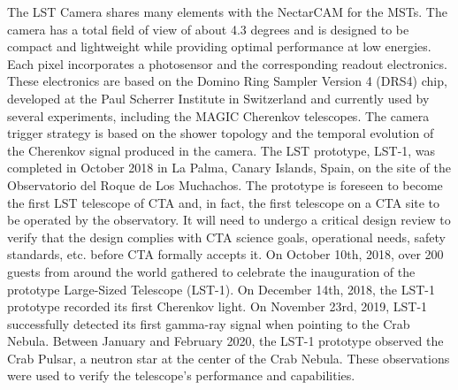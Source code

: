 The LST Camera shares many elements with the NectarCAM for the MSTs. The camera has a total field of view of about 4.3 degrees and is designed to be compact and lightweight while providing optimal performance at low energies. Each pixel incorporates a photosensor and the corresponding readout electronics. These electronics are based on the Domino Ring Sampler Version 4 (DRS4) chip, developed at the Paul Scherrer Institute in Switzerland and currently used by several experiments, including the MAGIC Cherenkov telescopes. The camera trigger strategy is based on the shower topology and the temporal evolution of the Cherenkov signal produced in the camera. The LST prototype, LST-1, was completed in October 2018 in La Palma, Canary Islands, Spain, on the site of the Observatorio del Roque de Los Muchachos. The prototype is foreseen to become the first LST telescope of CTA and, in fact, the first telescope on a CTA site to be operated by the observatory. It will need to undergo a critical design review to verify that the design complies with CTA science goals, operational needs, safety standards, etc. before CTA formally accepts it.
On October 10th, 2018, over 200 guests from around the world gathered to celebrate the inauguration of the prototype Large-Sized Telescope (LST-1). On December 14th, 2018, the LST-1 prototype recorded its first Cherenkov light. On November 23rd, 2019, LST-1 successfully detected its first gamma-ray signal when pointing to the Crab Nebula. Between January and February 2020, the LST-1 prototype observed the Crab Pulsar, a neutron star at the center of the Crab Nebula. These observations were used to verify the telescope's performance and capabilities.

